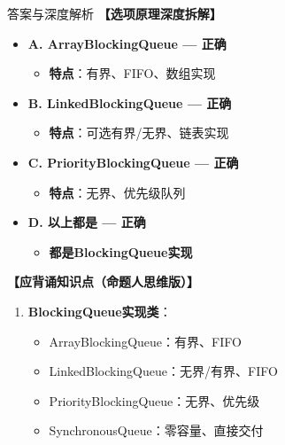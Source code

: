 \documentclass[12pt, a4paper]{ctexart}
\begin{document}
\begin{enumerate}[label=\textbf{\arabic*.}]
\begin{bluebox}{答案与深度解析}
		      \textbf{【选项原理深度拆解】}
					  \begin{itemize}[label={}, leftmargin=*, nosep]

		      \item \textbf{A. ArrayBlockingQueue — 正确}
		      \begin{itemize}[label={}, leftmargin=*, nosep]
			      \item \textbf{特点}：有界、FIFO、数组实现
		      \end{itemize}

		      \item \textbf{B. LinkedBlockingQueue — 正确}
		      \begin{itemize}[label={}, leftmargin=*, nosep]
			      \item \textbf{特点}：可选有界/无界、链表实现
		      \end{itemize}

		      \item \textbf{C. PriorityBlockingQueue — 正确}
		      \begin{itemize}[label={}, leftmargin=*, nosep]
			      \item \textbf{特点}：无界、优先级队列
		      \end{itemize}

		      \item \textbf{D. 以上都是 — 正确}
		      \begin{itemize}[label={}, leftmargin=*, nosep]
			      \item \textbf{都是BlockingQueue实现}
		      \end{itemize}

		      \end{itemize}

		      \textbf{【应背诵知识点（命题人思维版）】}
		      \begin{enumerate}[label={}, leftmargin=*, nosep]
			      \item \textbf{BlockingQueue实现类}：
			            \begin{itemize}[label={}, nosep]
				            \item ArrayBlockingQueue：有界、FIFO
				            \item LinkedBlockingQueue：无界/有界、FIFO
				            \item PriorityBlockingQueue：无界、优先级
				            \item SynchronousQueue：零容量、直接交付
			            \end{itemize}
		      \end{enumerate}


\end{bluebox}
\end{enumerate}
\end{document}
